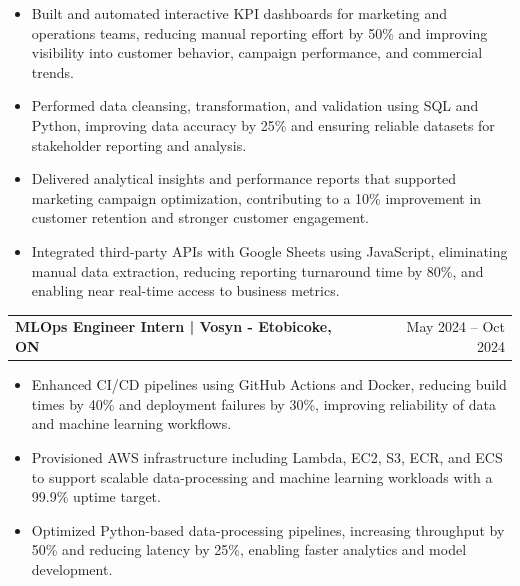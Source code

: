 \documentclass[10.5pt,letterpaper]{article}
\makeatletter
\newcommand{\resumeRow}[2]{%
  \noindent\begin{tabularx}{\linewidth}{@{}X r@{}}
    \textbf{#1} & #2 \\
  \end{tabularx}%
}
\makeatother
\begin{document}
\begin{itemize}
  \item Built and automated interactive KPI dashboards for marketing and operations teams, reducing manual reporting effort by 50\% and improving visibility into customer behavior, campaign performance, and commercial trends.
  \item Performed data cleansing, transformation, and validation using SQL and Python, improving data accuracy by 25\% and ensuring reliable datasets for stakeholder reporting and analysis.
  \item Delivered analytical insights and performance reports that supported marketing campaign optimization, contributing to a 10\% improvement in customer retention and stronger customer engagement.
  \item Integrated third-party APIs with Google Sheets using JavaScript, eliminating manual data extraction, reducing reporting turnaround time by 80\%, and enabling near real-time access to business metrics.
\end{itemize}
\resumeRow{MLOps Engineer Intern | Vosyn - Etobicoke, ON}{May 2024 -- Oct 2024}
\begin{itemize}
  \item Enhanced CI/CD pipelines using GitHub Actions and Docker, reducing build times by 40\% and deployment failures by 30\%, improving reliability of data and machine learning workflows.
  \item Provisioned AWS infrastructure including Lambda, EC2, S3, ECR, and ECS to support scalable data-processing and machine learning workloads with a 99.9\% uptime target.
  \item Optimized Python-based data-processing pipelines, increasing throughput by 50\% and reducing latency by 25\%, enabling faster analytics and model development.
\end{itemize}

\end{document}
